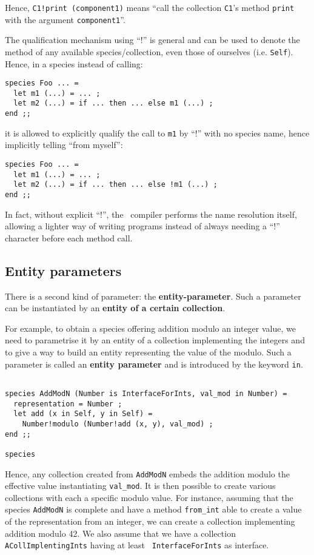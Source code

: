 Hence, {\tt C1!print (component1)} means ``call the collection
{\tt C1}'s method {\tt print} with the argument {\tt component1}''. 

The
qualification mechanism using ``!'' is general and can be used to
denote the method of any available species/collection, even those of
ourselves (i.e. {\tt Self}). Hence, in a species instead of calling:
{\scriptsize
\begin{lstlisting}
species Foo ... =
  let m1 (...) = ... ;
  let m2 (...) = if ... then ... else m1 (...) ;
end ;;
\end{lstlisting}
}
it is allowed to explicitly qualify the call to {\tt m1} by ``!''
with no species name, hence implicitly telling ``from myself'':
{\scriptsize
\begin{lstlisting}
species Foo ... =
  let m1 (...) = ... ;
  let m2 (...) = if ... then ... else !m1 (...) ;
end ;;
\end{lstlisting}
}
In fact, without explicit ``!'', the \focal\ compiler performs the
name resolution itself, allowing a lighter way of writing programs
instead of always needing a ``!'' character before each method call.



\subsection{Entity parameters}
\label{entity-parameter}
There is a second kind of parameter: the {\bf entity-parameter}. Such
a parameter can be instantiated by an {\bf entity of a certain
  collection}.  

For example, to obtain a species offering addition modulo an
integer value, we need to parametrise it by an entity of a collection
implementing the integers and to give a way to build an entity
representing the value of the modulo. Such a parameter is called an
{\bf entity parameter} and is introduced by the keyword {\tt in}.
{\scriptsize
\begin{lstlisting}

species AddModN (Number is InterfaceForInts, val_mod in Number) =
  representation = Number ;
  let add (x in Self, y in Self) =
    Number!modulo (Number!add (x, y), val_mod) ;
end ;;

species
\end{lstlisting}
}

Hence, any collection created from {\tt AddModN} embeds the addition
modulo the effective value instantiating {\tt val\_mod}. It is then
possible to create various collections with each a specific modulo
value. For instance, assuming that the species {\tt AddModN} is
complete and have a method {\tt from\_int} able to create a value of
the representation from an integer, we can create a collection
implementing addition modulo 42. We also assume that we have a
collection {\tt ACollImplentingInts} having at least {\tt
  InterfaceForInts} as interface. 

